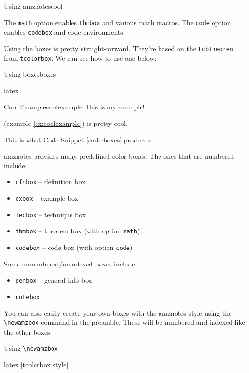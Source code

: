 \begin{codebox}{Using amznotes}{cool}

\end{codebox}

The \texttt{math} option enables \texttt{thmbox} and various math macros. The \texttt{code} option enables \texttt{codebox} and code environments.

Using the boxes is pretty straight-forward. They're based on the \texttt{tcbtheorem} from \texttt{tcolorbox}. We can see how to use one below:
\begin{codebox}{Using boxes}{boxes}
    \begin{amzcode}{latex}
        \begin{exbox}{Cool Example}{coolexample}
            This is my example!
        \end{exbox}
         (example \ref{ex:coolexample}) is pretty cool.
    \end{amzcode}
\end{codebox}

This is what Code Snippet \ref{code:boxes} produces:


amznotes provides many predefined color boxes. The ones that are numbered include:
\begin{itemize}[noitemsep]
    \item \texttt{dfnbox} -- definition box
    \item \texttt{exbox} -- example box
    \item \texttt{tecbox} -- technique box
    \item \texttt{thmbox} -- theorem box (with option \texttt{math})
    \item \texttt{codebox} -- code box (with option \texttt{code})
\end{itemize}

Some unnumbered/unindexed boxes include:
\begin{itemize}[noitemsep]
    \item \texttt{genbox} -- general info box
    \item \texttt{notebox}
\end{itemize}

You can also easily create your own boxes with the amznotes style using the \texttt{\textbackslash newamzbox} command in the preamble. These will be numbered and indexed like the other boxes.

\begin{codebox}{Using \texttt{\textbackslash newamzbox}}{}
    \begin{amzcode}{latex}
        [tcolorbox style]
    \end{amzcode}
\end{codebox}

